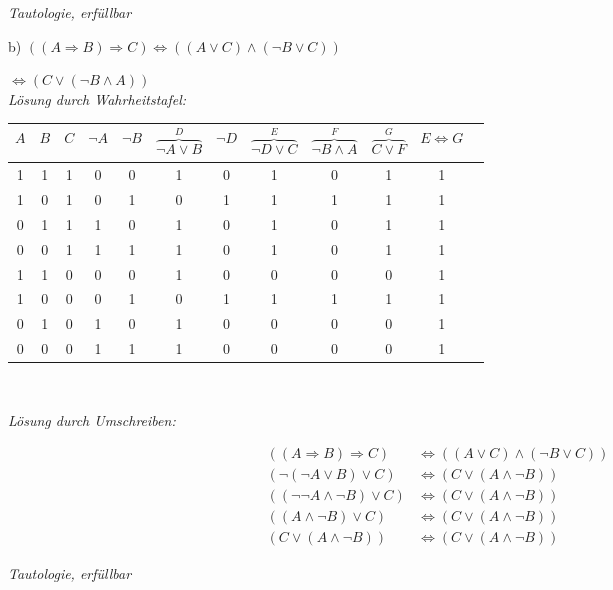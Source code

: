 \textit{Tautologie, erfüllbar}\\

\newpage

b) $((A \Rightarrow B) \Rightarrow C) \Leftrightarrow ((A \lor C) \land (\lnot B \lor C))$

\hspace{3.57cm}$\Leftrightarrow (C \lor (\lnot B \land A))$\\

\textit{Lösung durch Wahrheitstafel:}

\begin{table}[h]
\centering
\begin{tabular}{c|c|c|c|c|c|c|c|c|c|c|c}
$A$ & $B$ & $C$ & $\lnot A$ & $\lnot B$ & $\overbrace{\lnot A \lor B}^{D}$ & $\lnot D$ & $\overbrace{\lnot D \lor C}^{E}$ & $\overbrace{\lnot B \land A}^{F}$ & $\overbrace{C \lor F}^{G}$ & $E \Leftrightarrow G$\\
\hline
1 & 1 & 1 & 0 & 0 & 1 & 0 & 1 & 0 & 1 & 1\\
1 & 0 & 1 & 0 & 1 & 0 & 1 & 1 & 1 & 1 & 1\\
0 & 1 & 1 & 1 & 0 & 1 & 0 & 1 & 0 & 1 & 1\\
0 & 0 & 1 & 1 & 1 & 1 & 0 & 1 & 0 & 1 & 1\\
1 & 1 & 0 & 0 & 0 & 1 & 0 & 0 & 0 & 0 & 1\\
1 & 0 & 0 & 0 & 1 & 0 & 1 & 1 & 1 & 1 & 1\\
0 & 1 & 0 & 1 & 0 & 1 & 0 & 0 & 0 & 0 & 1\\
0 & 0 & 0 & 1 & 1 & 1 & 0 & 0 & 0 & 0 & 1\\
\end{tabular}
\end{table}\

\textit{Lösung durch Umschreiben:}

\begin{align*}
((A \Rightarrow B) \Rightarrow C) &\Leftrightarrow ((A \lor C) \land (\lnot B \lor C))\\
(\lnot (\lnot A \lor B) \lor C) &\Leftrightarrow (C \lor (A \land \lnot B))\\
((\lnot \lnot A \land \lnot B) \lor C) &\Leftrightarrow (C \lor (A \land \lnot B))\\
((A \land \lnot B) \lor C) &\Leftrightarrow (C \lor (A \land \lnot B))\\
(C \lor (A \land \lnot B)) &\Leftrightarrow (C \lor (A \land \lnot B))
\end{align*}

\textit{Tautologie, erfüllbar}\\

